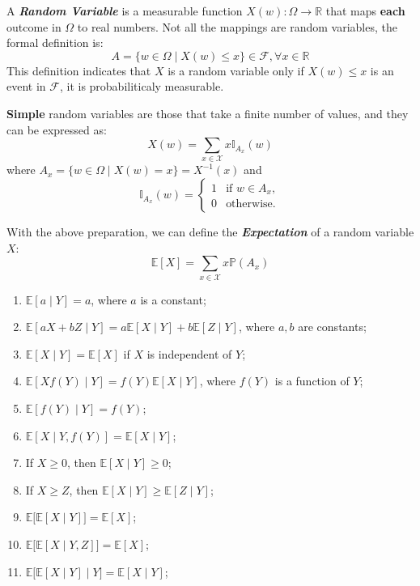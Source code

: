 \documentclass[10pt]{elegantbook}
\newcommand{\mydefination}[1]{\textbf{\textit{\textcolor{structurecolor}{#1}}}}
\begin{document}
A \mydefination{Random Variable} is a measurable function $X(w): \Omega \rightarrow \mathbb R$ that maps \textbf{each} outcome in $\Omega$ to real numbers.
Not all the mappings are random variables, the formal definition is:
\[ A = \{ w \in \Omega \mid X(w) \leq x \} \in \mathcal F, \forall x \in \mathbb R \]
This definition indicates that $X$ is a random variable only if $X(w) \leq x$ is an event in $\mathcal F$, it is probabiliticaly measurable.

\textbf{Simple} random variables are those that take a finite number of values, and they can be expressed as:
\[ X(w) = \sum_{x \in \mathcal X} x \mathbb{I}_{A_x}(w) \]
where $A_x = \{ w \in \Omega \mid X(w) = x \} = X^{-1}(x)$
and
\[
\mathbb{I}_{A_x}(w) = \begin{cases}
    1 & \text{if } w \in A_x, \\
    0 & \text{otherwise}.
\end{cases}
\]

With the above preparation, we can define the \mydefination{Expectation} of a random variable $X$:
\begin{equation}
    \mathbb E[X] = \sum_{x \in \mathcal X} x \mathbb P(A_x)
\end{equation}

\begin{lemma}
    \begin{enumerate}
        \item $\mathbb E[a \mid Y] = a$, where $a$ is a constant;
        \item $\mathbb E[aX + bZ \mid Y] = a \mathbb E[X \mid Y] + b \mathbb E[Z \mid Y]$, where $a, b$ are constants;
        \item $\mathbb E[X \mid Y] = \mathbb E[X]$ if $X$ is independent of $Y$;
        \item $\mathbb E[Xf(Y) \mid Y] = f(Y) \mathbb E[X \mid Y]$, where $f(Y)$ is a function of $Y$;
        \item $\mathbb E[f(Y) \mid Y] = f(Y)$;
        \item $\mathbb E[X \mid Y, f(Y)] = \mathbb E[X \mid Y]$;
        \item If $X \geq 0$, then $\mathbb E[X \mid Y] \geq 0$;
        \item If $X \geq Z$, then $\mathbb E[X \mid Y] \geq \mathbb E[Z \mid Y]$;
        \item $\mathbb E \big [ \mathbb E[X \mid Y] \big ] = \mathbb E[X]$;
        \item $\mathbb E \big [ \mathbb E[X \mid Y, Z] \big ] = \mathbb E[X]$;
        \item $\mathbb E \big [ \mathbb E[X \mid Y] \mid Y \big ] = \mathbb E[X \mid Y]$;
    \end{enumerate}
\end{lemma}
\end{document}
